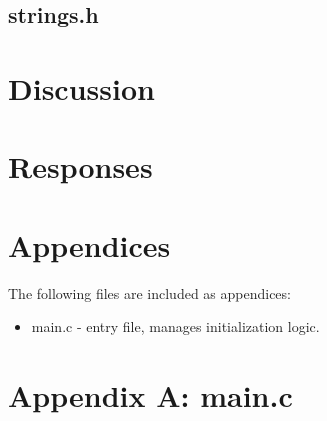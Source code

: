 \documentclass[letterpaper,11pt]{texMemo} %
\begin{document}
\subsection*{strings.h}

\section*{Discussion}


\newpage
\section*{Responses}


\section*{Appendices}
The following files are included as appendices:
\begin{itemize}
\item main.c - entry file, manages initialization logic.
\end{itemize}
\newpage

\section*{Appendix A: main.c}
\begin{tiny}

\end{tiny}
\newpage
\end{document}
